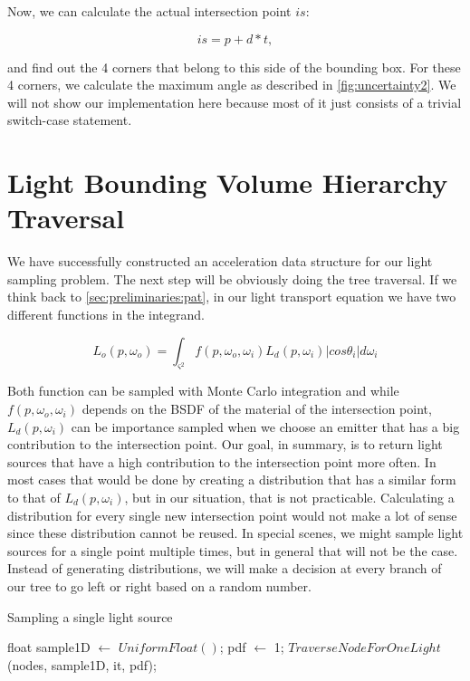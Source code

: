 Now, we can calculate the actual intersection point $is$:

\begin{equation}
is = p + d * t,
\end{equation}

and find out the 4 corners that belong to this side of the bounding box. For these 4 corners, we calculate the maximum angle as described in \ref{fig:uncertainty2}. We will not show our implementation here because most of it just consists of a trivial switch-case statement.

\section{Light Bounding Volume Hierarchy Traversal}
\label{sec:alg:tra}

We have successfully constructed an acceleration data structure for our light sampling problem. The next step will be obviously doing the tree traversal. If we think back to \ref{sec:preliminaries:pat}, in our light transport equation we have two different functions in the integrand. 

\begin{equation}
L_o(p, \omega_o) = \int_{\varsigma^2}f(p, \omega_o, \omega_i)L_d(p, \omega_i)|cos\theta_i|d\omega_i
\end{equation}

Both function can be sampled with Monte Carlo integration and while $f(p, \omega_o, \omega_i)$ depends on the BSDF of the material of the intersection point, $L_d(p, \omega_i)$ can be importance sampled when we choose an emitter that has a big contribution to the intersection point. Our goal, in summary, is to return light sources that have a high contribution to the intersection point more often. In most cases that would be done by creating a distribution that has a similar form to that of $L_d(p, \omega_i)$, but in our situation, that is not practicable. Calculating a distribution for every single new intersection point would not make a lot of sense since these distribution cannot be reused. In special scenes, we might sample light sources for a single point multiple times, but in general that will not be the case. Instead of generating distributions, we will make a decision at every branch of our tree to go left or right based on a random number.


\begin{algorithm}
	\caption{Sampling a single light source}
	\label{alg:sample1}
	\begin{algorithmic}[1] %
			\State float sample1D $\gets$ $UniformFloat()$;
			\State *pdf $\gets$ 1;
			\State \Return $TraverseNodeForOneLight$(nodes, sample1D, it, pdf);
			\EndProcedure
		\end{algorithmic}
	\end{algorithm}
	
